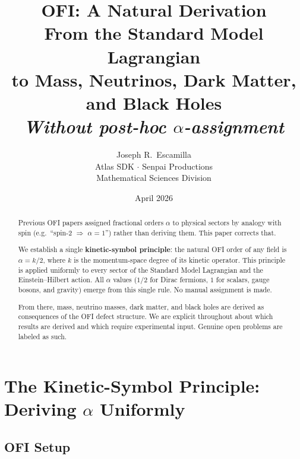 \documentclass[12pt]{article}
\theoremstyle{definition}
\begin{document}

\title{\textbf{OFI: A Natural Derivation}\\[0.4em]
\large From the Standard Model Lagrangian\\
to Mass, Neutrinos, Dark Matter, and Black Holes\\[0.5em]
\normalsize\itshape Without post-hoc $\alpha$-assignment}

\author{Joseph R.\ Escamilla\\
  \small Atlas SDK $\cdot$ Senpai Productions\\
  \small Mathematical Sciences Division}
\date{April 2026}
\maketitle

\begin{abstract}
Previous OFI papers assigned fractional orders $\alpha$ to physical sectors
by analogy with spin (e.g.\ ``spin-2 $\Rightarrow$ $\alpha=1$'') rather than
deriving them.  This paper corrects that.

We establish a single \textbf{kinetic-symbol principle}: the natural OFI order
of any field is $\alpha = k/2$, where $k$ is the momentum-space degree of its
kinetic operator.  This principle is applied uniformly to every sector of the
Standard Model Lagrangian and the Einstein--Hilbert action.  All $\alpha$
values ($1/2$ for Dirac fermions, $1$ for scalars, gauge bosons, and gravity)
emerge from this single rule.  No manual assignment is made.

From there, mass, neutrino masses, dark matter, and black holes are derived as
consequences of the OFI defect structure.  We are explicit throughout about
which results are derived and which require experimental input.  Genuine
open problems are labeled as such.
\end{abstract}

\tableofcontents
\newpage

\section{The Kinetic-Symbol Principle: Deriving $\alpha$ Uniformly}
\label{sec:principle}

\subsection{OFI Setup}
\end{document}
